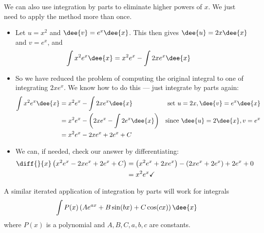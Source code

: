 We can also use integration by parts to eliminate higher powers of $x$. We just
need to apply the method more than once.
\begin{eg}\label{eg:PRTSxtwoex}
\soln
\begin{itemize}
 \item Let $u=x^2$ and $\dee{v}=e^x\dee{x}$. This then gives
$\dee{u}=2x\dee{x}$ and $v=e^x$, and
\begin{align*}
  \int x^2 e^x \dee{x} &= x^2 e^x - \int 2x e^x \dee{x}
\end{align*}
\item So we have reduced the problem of computing the original integral to one of
integrating $2xe^x$. We know how to do this --- just integrate by parts again:
\begin{align*}
  \int x^2 e^x \dee{x} &= x^2 e^x - \int 2x e^x \dee{x}
& \text{set $u=2x, \dee{v}=e^x\dee{x}$}\\
  &= x^2 e^x - \left( 2xe^x - \int 2 e^x \dee{x} \right)
& \text{since $\dee{u}=2\dee{x}, v=e^x$}\\
  &= x^2 e^x - 2xe^x + 2e^x + C
\end{align*}
\item We can, if needed, check our answer by differentiating:
\begin{align*}
  \diff{}{x} \left( x^2 e^x - 2xe^x + 2e^x + C \right)
  &= \left( x^2 e^x + 2xe^x \right) - \left(2x e^x + 2e^x \right) + 2e^x + 0 \\
  &= x^2 e^x \checkmark
\end{align*}
\end{itemize}
A similar iterated application of integration by parts will work for integrals
\begin{align*}
  \int P(x) \left(Ae^{ax} + B\sin(bx) + C\cos(cx) \right) \dee{x}
\end{align*}
where $P(x)$ is a polynomial and $A,B,C,a,b,c$ are constants.
\end{eg}

